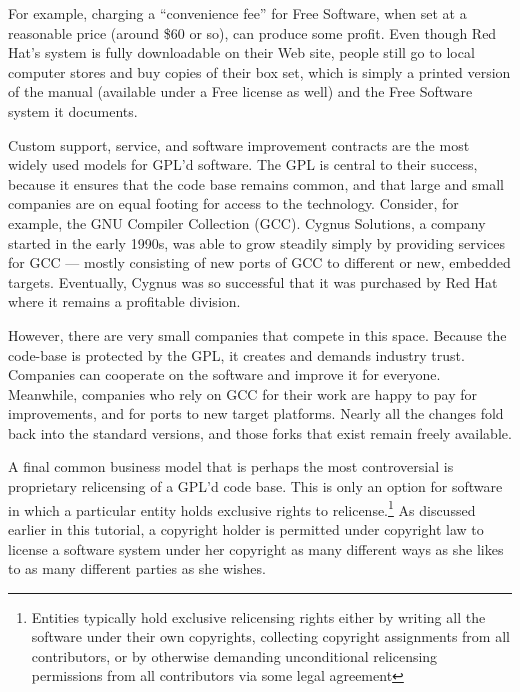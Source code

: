 For example, charging a ``convenience fee'' for Free Software,
when set at a reasonable price (around \$60 or so), can produce some
profit. Even though Red Hat's system is fully downloadable on their
Web site, people still go to local computer stores and buy copies of their
box set, which is simply a printed version of the manual (available under
a Free license as well) and the Free Software system it documents.

\medskip

Custom support, service, and software improvement contracts
are the most widely used models for GPL'd software. The GPL is
central to their success, because it ensures that the code base
remains common, and that large and small companies are on equal
footing for access to the technology. Consider, for example, the GNU
Compiler Collection (GCC). Cygnus Solutions, a company started in the
early 1990s, was able to grow steadily simply by providing services
for GCC --- mostly consisting of new ports of GCC to different or new,
embedded targets. Eventually, Cygnus was so successful that
it was purchased by Red Hat where it remains a profitable division.

However, there are very small companies that compete in
this space. Because the code-base is protected by the GPL, it creates and
demands industry trust. Companies can cooperate on the software and
improve it for everyone. Meanwhile, companies who rely on GCC for their
work are happy to pay for improvements, and for ports to new target
platforms. Nearly all the changes fold back into the standard
versions, and those forks that exist remain freely available.

\medskip

\label{Proprietary Relicensing}

A final common business model that is perhaps the most controversial is
proprietary relicensing of a GPL'd code base. This is only an option for
software in which a particular entity holds exclusive rights to
relicense.\footnote{Entities typically hold exclusive relicensing rights
  either by writing all the software under their own copyrights, collecting
  copyright assignments from all contributors, or by otherwise demanding
  unconditional relicensing permissions from all contributors via some legal
  agreement} As discussed earlier in this tutorial, a copyright holder is
permitted under copyright law to license a software system under her
copyright as many different ways as she likes to as many different parties as
she wishes.

